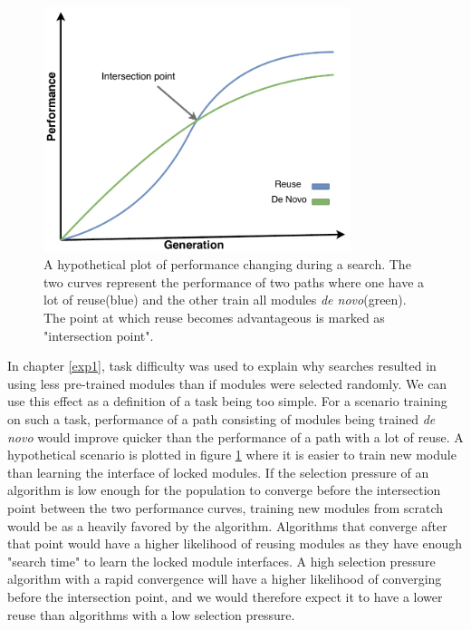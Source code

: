 \begin{figure}[ht]
    \centering
    \includegraphics[width=0.8\textwidth]{Chapters/4.Experiments/exp2/figures/reuse_vs_new.pdf}
    \caption[Hypothetical performance plot]{A hypothetical plot of performance changing during a search. The two curves represent the performance of two paths where one have a lot of reuse(blue) and the other train all modules \textit{de novo}(green). The point at which reuse becomes advantageous is marked as "intersection point".}
    \label{fig:reuse_vs_new}
\end{figure}

In chapter \ref{exp1}, task difficulty was used to explain why searches resulted in using less pre-trained modules than if modules were selected randomly. We can use this effect as a definition of a task being too simple. For a scenario training on such a task, performance of a path consisting of modules being trained \textit{de novo} would improve quicker than the performance of a path with a lot of reuse. A hypothetical scenario is plotted in figure \ref{fig:reuse_vs_new} where it is easier to train new module than learning the interface of locked modules. If the selection pressure of an algorithm is low enough for the population to converge before the intersection point between the two performance curves, training new modules from scratch would be as a heavily favored by the algorithm.  Algorithms that converge after that point would have a higher likelihood of reusing modules as they have enough "search time" to learn the locked module interfaces. A high selection pressure algorithm with a rapid convergence will have a higher likelihood of converging before the intersection point, and we would therefore expect it to have a lower reuse than algorithms with a low selection pressure. 

